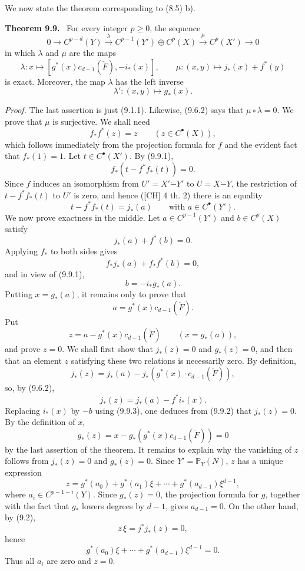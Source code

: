 \documentclass[11pt]{article}
\newenvironment{statement}[1]{\par\medskip\noindent\textbf{#1.}\ }{\par\medskip}
\begin{document}
We now state the theorem corresponding to (8.5) b).

\begin{statement}{Theorem 9.9}
For every integer $p\ge0$, the sequence
\[
0\to C^{p-d}(Y)\xrightarrow{\lambda} C^{p-1}(Y')\oplus C^p(X)\xrightarrow{\mu} C^p(X')\to0
\]
in which $\lambda$ and $\mu$ are the maps
\[
\lambda:x\mapsto[g^*(x)c_{d-1}(\check F),-i_*(x)],
\qquad
\mu:(x,y)\mapsto j_*(x)+f^*(y)
\]
is exact. Moreover, the map $\lambda$ has the left inverse
\[
\lambda':(x,y)\mapsto g_*(x).
\]
\end{statement}

\emph{Proof.} The last assertion is just (9.1.1). Likewise, (9.6.2) says that $\mu\circ\lambda=0$. We prove that $\mu$ is surjective. We shall need
\[
f_*f^*(z)=z\qquad(z\in C^{\bullet}(X)),
\tag{9.9.1}
\]
which follows immediately from the projection formula for $f$ and the evident fact that $f_*(1)=1$. Let $t\in C^{\bullet}(X')$. By (9.9.1),
\[
f_*(t-f^*f_*(t))=0.
\]
Since $f$ induces an isomorphism from $U'=X'\mathbin{\dot{-}}Y'$ to $U=X\mathbin{\dot{-}}Y$, the restriction of $t-f^*f_*(t)$ to $U'$ is zero, and hence ([CH] 4 th. 2) there is an equality
\[
t-f^*f_*(t)=j_*(a)
\qquad\text{with }a\in C^{\bullet}(Y').
\]
We now prove exactness in the middle. Let $a\in C^{p-1}(Y')$ and $b\in C^p(X)$ satisfy
\[
j_*(a)+f^*(b)=0.
\tag{9.9.2}
\]
Applying $f_*$ to both sides gives
\[
f_*j_*(a)+f_*f^*(b)=0,
\]
and in view of (9.9.1),
\[
b=-i_*g_*(a).
\tag{9.9.3}
\]
Putting $x=g_*(a)$, it remains only to prove that
\[
a=g^*(x)c_{d-1}(\check F).
\tag{9.9.4}
\]
Put
\[
z=a-g^*(x)c_{d-1}(\check F)\qquad(x=g_*(a)),
\]
and prove $z=0$. We shall first show that $j_*(z)=0$ and $g_*(z)=0$, and then that an element $z$ satisfying these two relations is necessarily zero. By definition,
\[
j_*(z)=j_*(a)-j_*(g^*(x)\cdot c_{d-1}(\check F)),
\]
so, by (9.6.2),
\[
j_*(z)=j_*(a)-f^*i_*(x).
\]
Replacing $i_*(x)$ by $-b$ using (9.9.3), one deduces from (9.9.2) that $j_*(z)=0$. By the definition of $x$,
\[
g_*(z)=x-g_*(g^*(x)c_{d-1}(\check F))=0
\]
by the last assertion of the theorem. It remains to explain why the vanishing of $z$ follows from $j_*(z)=0$ and $g_*(z)=0$. Since $Y'=\mathbb P_Y(N)$, $z$ has a unique expression
\[
z=g^*(a_0)+g^*(a_1)\xi+\cdots+g^*(a_{d-1})\xi^{d-1},
\]
where $a_i\in C^{p-1-i}(Y)$. Since $g_*(z)=0$, the projection formula for $g$, together with the fact that $g_*$ lowers degrees by $d-1$, gives $a_{d-1}=0$. On the other hand, by (9.2),
\[
z\,\xi=j^*j_*(z)=0,
\]
hence
\[
g^*(a_0)\xi+\cdots+g^*(a_{d-1})\xi^{d-1}=0.
\]
Thus all $a_i$ are zero and $z=0$.
\end{document}
